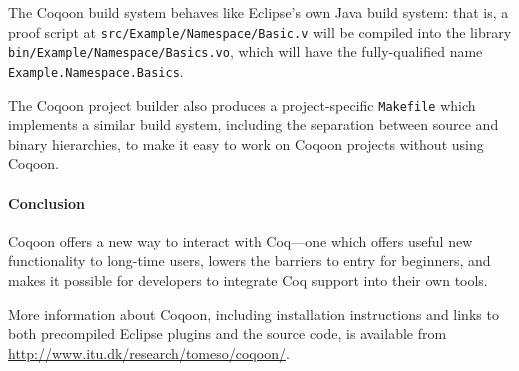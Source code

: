 \documentclass{article}
\begin{document}
The Coqoon build system behaves like Eclipse's own Java build system: that is,
a proof script at \texttt{src/Example/Namespace/Basic.v} will be compiled into
the library \texttt{bin/Example/Namespace/Basics.vo}, which will have the
fully-qualified name \texttt{Example.Namespace.Basics}.

The Coqoon project builder also produces a project-specific \texttt{Makefile}
which implements a similar build system, including the separation between
source and binary hierarchies, to make it easy to work on Coqoon projects
without using Coqoon.

\paragraph{Conclusion}

Coqoon offers a new way to interact with Coq---one which offers useful new
functionality to long-time users, lowers the barriers to entry for beginners,
and makes it possible for developers to integrate Coq support into their own
tools.

More information about Coqoon, including installation instructions and links to
both precompiled Eclipse plugins and the source code, is available from
\linebreak
\url{http://www.itu.dk/research/tomeso/coqoon/}.



\end{document}
